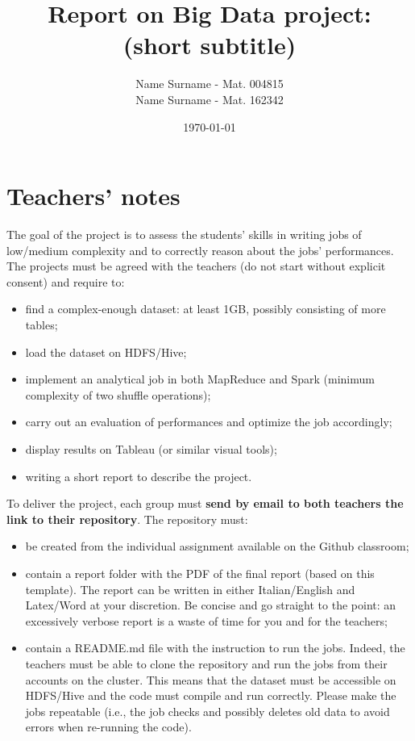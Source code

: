 \documentclass[10pt]{article}
\title{\textbf{Report on Big Data project: \\(short subtitle)}}
\author{
	Name Surname - Mat. 004815\\
	Name Surname - Mat. 162342}
\date{\today}
\begin{document}
\maketitle
\newpage

\tableofcontents

\newpage

\section{Teachers' notes}

The goal of the project is to assess the students' skills in writing jobs of low/medium complexity and to correctly reason about the jobs' performances. The projects must be agreed with the teachers (do not start without explicit consent) and require to:

\begin{itemize}
\item find a complex-enough dataset: at least 1GB, possibly consisting of more tables;
\item load the dataset on HDFS/Hive;
\item implement an analytical job in both MapReduce and Spark (minimum complexity of two shuffle operations);
\item carry out an evaluation of performances and optimize the job accordingly;
\item display results on Tableau (or similar visual tools);
\item writing a short report to describe the project.
\end{itemize}

To deliver the project, each group must {\bf send by email to both teachers the link to their repository}. The repository must:
\begin{itemize}
\item be created from the individual assignment available on the Github classroom;
\item contain a {\sf report} folder with the PDF of the final report (based on this template). The report can be written in either Italian/English and Latex/Word at your discretion. Be concise and go straight to the point: an excessively verbose report is a waste of time for you and for the teachers;
\item contain a {\sf README.md} file with the instruction to run the jobs. Indeed, the teachers must be able to clone the repository and run the jobs from their accounts on the cluster. This means that the dataset must be accessible on HDFS/Hive and the code must compile and run correctly. Please make the jobs repeatable (i.e., the job checks and possibly deletes old data to avoid errors when re-running the code).
\end{itemize}
\end{document}
